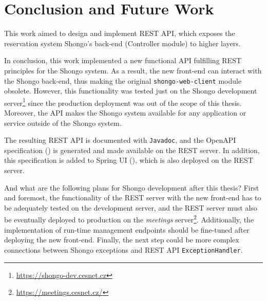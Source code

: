 \chapter{Conclusion and Future Work} \label{cha:conclusion}
This work aimed to design and implement REST API, which exposes the reservation system Shongo's back-end (Controller module) to higher layers.

In conclusion, this work implemented a new functional API fulfilling REST principles for the Shongo system.
As a result, the new front-end \cite{drobnakm} can interact with the Shongo back-end, thus making the original \texttt{shongo-web-client} module obsolete. However, this functionality was tested just on the Shongo development server\footnote{\url{https://shongo-dev.cesnet.cz}} since the production deployment was out of the scope of this thesis.
Moreover, the API makes the Shongo system available for any application or service outside of the Shongo system.

The resulting REST API is documented with \texttt{Javadoc}, and the OpenAPI specification () is generated and made available on the REST server.
In addition, this specification is added to Spring UI (), which is also deployed on the REST server.

And what are the following plans for Shongo development after this thesis?
First and foremost, the functionality of the REST server with the new front-end has to be adequately tested on the development server, and the REST server must also be eventually deployed to production on the  \emph{meetings} server\footnote{\url{https://meetings.cesnet.cz/}}.
Additionally, the implementation of run-time management endpoints should be fine-tuned after deploying the new front-end.
Finally, the next step could be more complex connections between Shongo exceptions and REST API \texttt{ExceptionHandler}.
